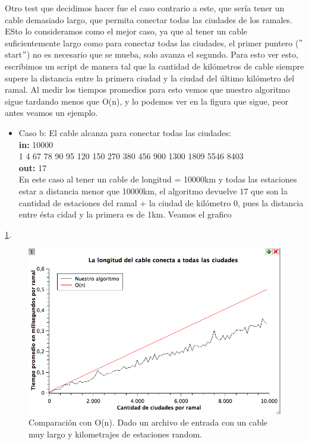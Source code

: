 Otro test que decidimos hacer fue el caso contrario a este, que sería tener un cable demasiado largo, que permita conectar todas las ciudades de los ramales. ESto lo consideramos como el mejor caso, ya que al tener un cable suficientemente largo como para conectar todas las ciudades, el primer puntero ($"$start$"$) no es necesario que se mueba, solo avanza el segundo. Para esto ver esto, escribimos un script de manera tal que la cantidad de kilómetros de cable siempre supere la distancia entre la primera ciudad y la ciudad del último kilómetro del ramal. Al medir los tiempos promedios para esto vemos que nuestro algoritmo sigue tardando menos que O(n), y lo podemos ver en la figura que sigue, peor antes veamos un ejemplo. \\

\begin{itemize}
\item Caso b: El cable alcanza para conectar todas las ciudades:\\
\textbf{in:}
10000\\
1 4 67 78 90 95 120 150 270 380 456 900 1300 1809 5546 8403\\
\textbf{out:}
17\\

En este caso al tener un cable de longitud = 10000km y todas las estaciones estar a distancia menor que 10000km, el algoritmo devuelve 17 que son la cantidad de estaciones del ramal + la ciudad de kilómetro 0, pues la distancia entre ésta cidad y la primera es de 1km. Veamos el grafico\\

\end{itemize}
\ref{ej1-tiempo-vs-cant-ciudades-random-long-cable-largo}. \\

\begin{figure}[H]
\begin{center}

  \includegraphics[width=\linewidth]{../graficos/ej1/CableLargo.png}
  \caption{{\small Comparación con O(n). Dado un archivo de entrada con un cable muy largo y kilometrajes de estaciones random.}} \label{ej1-tiempo-vs-cant-ciudades-random-long-cable-largo}
\endminipage

\end{center}
\end{figure}


